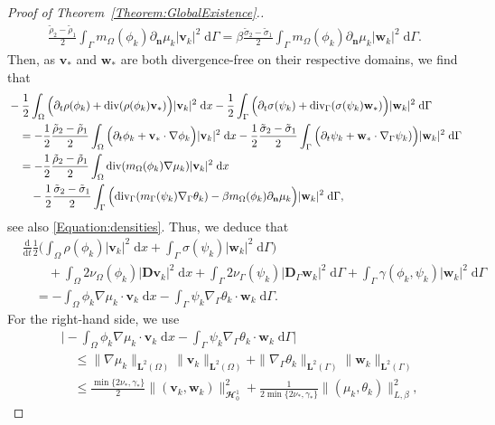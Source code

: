 \documentclass[10pt,reqno]{amsart}
\theoremstyle{remark}
\numberwithin{equation}{section}
\newcommand{\abs}[1]{| #1 |}
\newcommand{\Bigabs}[1]{\Big| #1 \Big|}
\newcommand{\norm}[1]{\| #1 \|}
\newcommand{\n}{\mathbf{n}}
\newcommand{\bv}{\mathbf{v}}
\newcommand{\bw}{\mathbf{w}}
\newcommand{\D}{\mathbf{D}}
\newcommand{\Dg}{\mathbf{D}_\Gamma}
\newcommand{\intO}{\int_\Omega}
\newcommand{\intG}{\int_\Gamma}
\newcommand{\dx}{\;\mathrm{d}x}
\newcommand{\dG}{\;\mathrm d\Ga}
\newcommand{\ddt}{\frac{\mathrm d}{\mathrm dt}}
\newcommand{\delt}{\partial_{t}}
\newcommand{\deln}{\partial_\n}
\newcommand{\Grad}{\nabla}
\newcommand{\Div}{\textnormal{div}}
\newcommand{\Gradg}{\nabla_\Ga}
\newcommand{\Divg}{\textnormal{div}_\Ga}
\newcommand{\Om}{\Omega}
\newcommand{\Ga}{\Gamma}
\begin{document}
\begin{proof}[Proof of Theorem~\ref{Theorem:GlobalExistence}.]
\begin{align*}
    \frac{\tilde\rho_2 - \tilde\rho_1}{2}\intG m_\Om(\phi_k)\deln\mu_k\abs{\bv_k}^2\dG = \beta\frac{\tilde\sigma_2 - \tilde\sigma_1}{2}\intG m_\Om(\phi_k)\deln\mu_k\abs{\bw_k}^2\dG.
\end{align*}
Then, as $\bv_\ast$ and $\bw_\ast$ are both divergence-free on their respective domains, we find that
\begin{align*}
        &- \frac12\intO \Big(\delt\rho(\phi_k) + \Div(\rho(\phi_k)\bv_\ast)\Big)\abs{\bv_k}^2\dx - \frac12\intG \Big(\delt\sigma(\psi_k) + \Divg(\sigma(\psi_k)\bw_\ast)\Big)\abs{\bw_k}^2\dG \\
        &\quad= - \frac12\frac{\tilde\rho_2 - \tilde\rho_1}{2}\intO\Big(\delt\phi_k + \bv_\ast\cdot\Grad\phi_k\Big)\abs{\bv_k}^2\dx - \frac12\frac{\tilde\sigma_2 - \tilde\sigma_1}{2}\intG\Big(\delt\psi_k + \bw_\ast\cdot\Gradg\psi_k)\Big)\abs{\bw_k}^2\dG \\ 
        &\quad= - \frac12\frac{\tilde\rho_2 - \tilde\rho_1}{2}\intO\Div(m_\Om(\phi_k)\Grad\mu_k)\abs{\bv_k}^2\dx \\
        &\qquad - \frac12\frac{\tilde\sigma_2 - \tilde\sigma_1}{2}\intG\Big(\Divg(m_\Ga(\psi_k)\Gradg\theta_k) - \beta m_\Om(\phi_k)\deln\mu_k\Big)\abs{\bw_k}^2\dG,
\end{align*}
see also \eqref{Equation:densities}.
Thus, we deduce that
\begin{align}\label{Energy:kin:id:}
    &\ddt\frac12\Big(\intO \rho(\phi_k)\abs{\bv_k}^2\dx + \intG \sigma(\psi_k)\abs{\bw_k}^2\dG\Big) \nonumber \\
    &\qquad + \intO 2\nu_\Om(\phi_k)\abs{\D\bv_k}^2\dx + \intG 2\nu_\Ga(\psi_k)\abs{\Dg\bw_k}^2\dG + \intG \gamma(\phi_k,\psi_k)\abs{\bw_k}^2\dG \\
    &\quad= - \intO \phi_k\Grad\mu_k\cdot\bv_k\dx - \intG \psi_k\Gradg\theta_k\cdot\bw_k\dG. \nonumber
\end{align}
For the right-hand side, we use
\begin{align*}
    &\Bigabs{- \intO \phi_k\Grad\mu_k\cdot\bv_k\dx - \intG \psi_k\Gradg\theta_k\cdot\bw_k\dG} \\
    &\quad\leq \norm{\Grad\mu_k}_{\mathbf{L}^2(\Om)}\norm{\bv_k}_{\mathbf{L}^2(\Om)} + \norm{\Gradg\theta_k}_{\mathbf{L}^2(\Ga)}\norm{\bw_k}_{\mathbf{L}^2(\Ga)} \\
    &\quad\leq \frac{\min\{2\nu_\ast,\gamma_\ast\}}{2}\norm{(\bv_k,\bw_k)}_{\mathbfcal{H}^1_{0}}^2 + \frac{1}{2\min\{2\nu_\ast,\gamma_\ast\}}\norm{(\mu_k,\theta_k)}_{L,\beta}^2,
\end{align*}

\end{proof}
\end{document}

